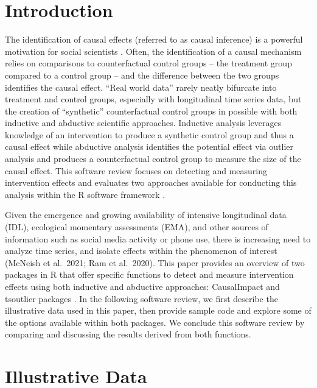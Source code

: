 \documentclass[12pt]{article}
\begin{document}
\hypertarget{introduction}{%
\section{Introduction}\label{introduction}}

The identification of causal effects (referred to as causal inference)
is a powerful motivation for social scientists
\citep{pearl2009causality}. Often, the identification of a causal
mechanism relies on comparisons to counterfactual control groups -- the
treatment group compared to a control group -- and the difference
between the two groups identifies the causal effect. ``Real world data''
rarely neatly bifurcate into treatment and control groups, especially
with longitudinal time series data, but the creation of ``synthetic''
counterfactual control groups in possible with both inductive and
abductive scientific approaches. Inductive analysis leverages knowledge
of an intervention to produce a synthetic control group and thus a
causal effect while abductive analysis identifies the potential effect
via outlier analysis and produces a counterfactual control group to
measure the size of the causal effect. This software review focuses on
detecting and measuring intervention effects and evaluates two
approaches available for conducting this analysis within the R software
framework \citep{rcore}.

Given the emergence and growing availability of intensive longitudinal
data (IDL), ecological momentary assessments (EMA), and other sources of
information such as social media activity or phone use, there is
increasing need to analyze time series, and isolate effects within the
phenomenon of interest (McNeish et al.~2021; Ram et al.~2020). This
paper provides an overview of two packages in R that offer specific
functions to detect and measure intervention effects using both
inductive and abductive approaches: \textsf{CausalImpact}
\citep{brodersen2015inferring} and \textsf{tsoutlier} packages
\citep{tsoutliers}. In the following software review, we first describe
the illustrative data used in this paper, then provide sample code and
explore some of the options available within both packages. We conclude
this software review by comparing and discussing the results derived
from both functions.

\hypertarget{illustrative-data}{%
\section{Illustrative Data}\label{illustrative-data}}
\end{document}
